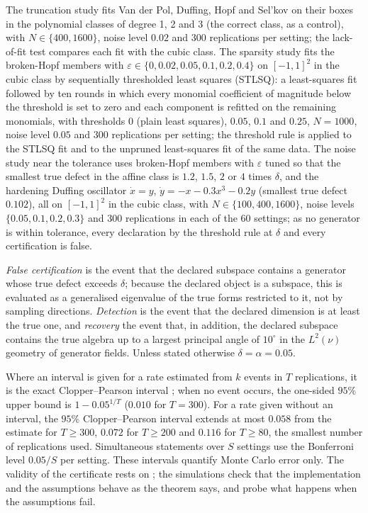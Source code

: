 The truncation study fits Van der Pol, Duffing, Hopf and Sel'kov on their
boxes in the polynomial classes of degree 1, 2 and 3 (the correct class, as a
control), with $N \in \{400, 1600\}$, noise level $0.02$ and $300$
replications per setting; the lack-of-fit test compares each fit with the
cubic class. The sparsity study fits the broken-Hopf members with $\varepsilon
\in \{0, 0.02, 0.05, 0.1, 0.2, 0.4\}$ on $[-1,1]^2$ in the cubic class by
sequentially thresholded least squares (STLSQ): a least-squares fit followed
by ten rounds in which every monomial coefficient of magnitude below the
threshold is set to zero and each component is refitted on the remaining
monomials, with thresholds $0$ (plain least squares), $0.05$, $0.1$ and
$0.25$, $N = 1000$, noise level $0.05$ and $300$ replications per setting; the
threshold rule is applied to the STLSQ fit and \symcert{} to the unpruned
least-squares fit of the same data. The noise study near the tolerance uses
broken-Hopf members with $\varepsilon$ tuned so that the smallest true defect
in the affine class is $1.2$, $1.5$, $2$ or $4$ times $\delta$, and the
hardening Duffing oscillator $\dot x = y$, $\dot y = -x - 0.3x^3 - 0.2y$
(smallest true defect $0.102$), all on $[-1,1]^2$ in the cubic class, with $N
\in \{100, 400, 1600\}$, noise levels $\{0.05, 0.1, 0.2, 0.3\}$ and $300$
replications in each of the $60$ settings; as no generator is within
tolerance, every declaration by the threshold rule at $\delta$ and every
certification is false.

\emph{False certification} is the event that the declared subspace contains a
generator whose true defect exceeds $\delta$; because the declared object is a
subspace, this is evaluated as a generalised eigenvalue of the true forms
restricted to it, not by sampling directions. \emph{Detection} is the event
that the declared dimension is at least the true one, and \emph{recovery} the
event that, in addition, the declared subspace contains the true algebra up to
a largest principal angle of $10^\circ$ in the $L^2(\nu)$ geometry of generator
fields. Unless stated otherwise $\delta = \alpha = 0.05$.

Where an interval is given for a rate estimated from $k$ events in $T$
replications, it is the exact Clopper--Pearson interval
\citep{clopper1934use}; when no event occurs, the one-sided $95\%$ upper bound
is $1 - 0.05^{1/T}$ ($0.010$ for $T = 300$). For a rate given without an
interval, the $95\%$ Clopper--Pearson interval extends at most $0.058$ from the
estimate for $T \ge 300$, $0.072$ for $T \ge 200$ and $0.116$ for $T \ge 80$,
the smallest number of replications used.
Simultaneous statements over $S$ settings use the Bonferroni level $0.05/S$
per setting. These intervals quantify Monte Carlo error only. The validity of
the certificate rests on ; the simulations check that
the implementation and the assumptions behave as the theorem says, and probe
what happens when the assumptions fail.

